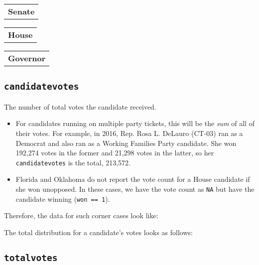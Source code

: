 \documentclass[12pt]{article}
\begin{document}
\begin{tabularx}{\linewidth}{C}
\textbf{Senate}\\

\end{tabularx}

\begin{tabularx}{\linewidth}{C}
\textbf{House}\\
 
\end{tabularx}

\begin{tabularx}{\linewidth}{C}
\textbf{Governor}\\

\end{tabularx}

\FloatBarrier

\subsection*{\texttt{candidatevotes}} 

The number of total votes the candidate received. 
\begin{itemize}
\item For candidates running on multiple party tickets, this will be the \emph{sum} of all of their votes.  For example, in 2016, Rep. Rosa L. DeLauro (CT-03) ran as a Democrat and also ran as a Working Families Party candidate. She won 192,274 votes in the former and 21,298 votes in the latter, so her \texttt{candidatevotes} is the total, 213,572.
\item  Florida and Oklahoma do not report the vote count for a House candidate if she won unopposed. In these cases, we have the vote count as \texttt{NA} but have the candidate winning (\texttt{won == 1}).
\end{itemize}

Therefore, the data for such corner cases look like:

\begin{table}[!h]
\centering
\footnotesize

\end{table}


The total distribution for a candidate's votes looks as follows:

\begin{table}[!h]
\centering
\footnotesize

\end{table}


\FloatBarrier

\subsection*{\texttt{totalvotes}}
\end{document}
